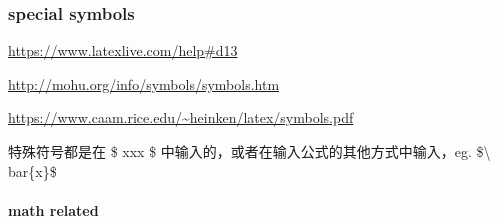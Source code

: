 
\subsubsection{special symbols}

\url{https://www.latexlive.com/help#d13}

\url{http://mohu.org/info/symbols/symbols.htm}

\url{https://www.caam.rice.edu/~heinken/latex/symbols.pdf}

特殊符号都是在 \$ xxx \$ 中输入的，或者在输入公式的其他方式中输入，{\color{DefinedColorRed}eg. \$\textbackslash 
bar\{x\}\$}

\newcommand\PrintCode[2]{\textcolor{DefinedColorGreen}{\textbackslash #1\{#2\}}}
\newcommand\PrintSymbol[1]{\textcolor{red}{$#1$}}
\newcommand\SpecCharPair[3]{\PrintSymbol{#1} & \PrintCode{#2}{#3}}

\paragraph{math related}~{}

